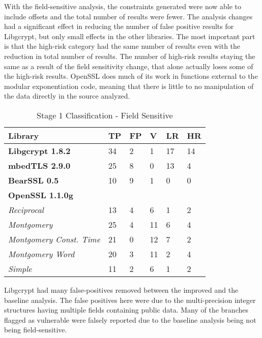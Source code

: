 \documentclass[11pt,a4paper]{article}
\begin{document}
With the field-sensitive analysis, the constraints generated were now able to
include offsets and the total number of results were fewer. The analysis changes
had a significant effect in reducing the number of false positive results for
Libgcrypt, but only small effects in the other libraries. The most important
part is that the high-risk category had the same number of results even with the
reduction in total number of results. The number of high-risk results staying
the same as a result of the field sensitivity change, that alone actually loses
some of the high-risk results. OpenSSL does much of its work in functions
external to the modular exponentiation code, meaning that there is little to no
manipulation of the data directly in the source analyzed.

\begin{table}
  \begin{tabular}{|p{2.5cm} | p{1.5cm}| p{1.5cm} | p{1.7cm}| p{1.5cm}| p{1.5cm}|}
    \hline
    \textbf{Library} &\textbf{TP}&\textbf{FP}&\textbf{V}&\textbf{LR}&\textbf{HR}\\
    \hline
    \textbf{Libgcrypt 1.8.2} & 34 &  2 & 1 & 17 & 14\\
    \textbf{mbedTLS 2.9.0} & 25   & 8  & 0 & 13 & 4 \\
    \textbf{BearSSL 0.5}& 10 & 9 & 1 & 0 & 0 \\
    \textbf{OpenSSL 1.1.0g}& & & & & \\
    \textit{Reciprocal} & 13 & 4  & 6 & 1 & 2 \\
    \textit{Montgomery} & 25 & 4   & 11   & 6  &  4  \\
    \textit{Montgomery Const. Time} & 21 & 0   & 12    &  7   &  2  \\
    \textit{Montgomery Word} & 20 & 3   & 11    & 2    & 4   \\
    \textit{Simple} & 11 & 2    & 6    & 1    & 2   \\
    \hline
  \end{tabular}
  \caption{Stage 1 Classification - Field Sensitive}
  \label{tbl:first-stage-with-offset}
\end{table}


Libgcrypt had many false-positives removed between the improved and the baseline
analysis. The false positives here were due to the multi-precision integer
structures having multiple fields containing public data. Many of the branches
flagged as vulnerable were falsely reported due to the baseline analysis being
not being field-sensitive.
\end{document}
